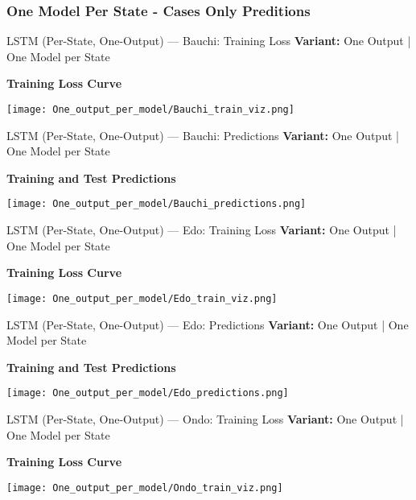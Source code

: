 \documentclass{beamer}
\begin{document}
\subsubsection{One Model Per State - Cases Only Preditions}
\begin{frame}{LSTM (Per-State, One-Output) — Bauchi: Training Loss}
\textbf{Variant:} One Output | One Model per State
\vspace{0.5em}

\textbf{Training Loss Curve}
\begin{center}
    \texttt{[image: One\_output\_per\_model/Bauchi\_train\_viz.png]}
\end{center}
\end{frame}

\begin{frame}{LSTM (Per-State, One-Output) — Bauchi: Predictions}
\textbf{Variant:} One Output | One Model per State
\vspace{0.5em}

\textbf{Training and Test Predictions}
\begin{center}
    \texttt{[image: One\_output\_per\_model/Bauchi\_predictions.png]}
\end{center}
\end{frame}

\begin{frame}{LSTM (Per-State, One-Output) — Edo: Training Loss}
\textbf{Variant:} One Output | One Model per State
\vspace{0.5em}

\textbf{Training Loss Curve}
\begin{center}
    \texttt{[image: One\_output\_per\_model/Edo\_train\_viz.png]}
\end{center}
\end{frame}

\begin{frame}{LSTM (Per-State, One-Output) — Edo: Predictions}
\textbf{Variant:} One Output | One Model per State
\vspace{0.5em}

\textbf{Training and Test Predictions}
\begin{center}
    \texttt{[image: One\_output\_per\_model/Edo\_predictions.png]}
\end{center}
\end{frame}

\begin{frame}{LSTM (Per-State, One-Output) — Ondo: Training Loss}
\textbf{Variant:} One Output | One Model per State
\vspace{0.5em}

\textbf{Training Loss Curve}
\begin{center}
    \texttt{[image: One\_output\_per\_model/Ondo\_train\_viz.png]}
\end{center}
\end{frame}
\end{document}
